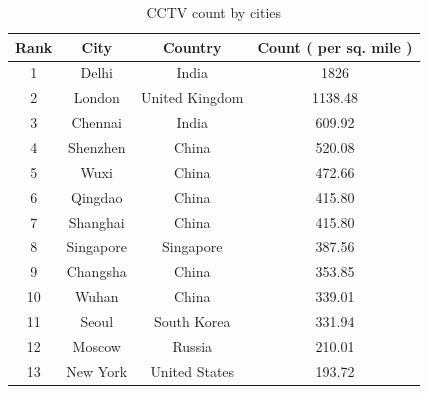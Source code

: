 \documentclass{fisatprojectfinal}
\begin{document}
\begin{table}[h!]
\begin{center}
	\caption{CCTV count by cities} 
\vspace{0.25in}
\begin{tabular}{|c|c|c|c|}
	
\hline Rank & City & Country & Count ( per sq. mile )  \\ 
\hline 1 & Delhi & India & 1826\\ 
\hline 2 & London & United Kingdom & 1138.48\\
\hline 3 & Chennai & India & 609.92\\ 
\hline 4 & Shenzhen & China & 520.08\\ 
\hline 5 & Wuxi & China & 472.66\\ 
\hline 6 & Qingdao & China & 415.80\\
\hline 7 & Shanghai & China & 415.80\\ 
\hline 8 & Singapore & Singapore & 387.56\\ 
\hline 9 & Changsha & China & 353.85\\ 
\hline 10 & Wuhan & China & 339.01\\ 
\hline 11 & Seoul & South Korea & 331.94\\
\hline 12 & Moscow & Russia & 210.01\\ 
\hline 13 & New York & United States & 193.72\\
\hline 
\end{tabular}
\end{center}
\end{table}
\end{document}

